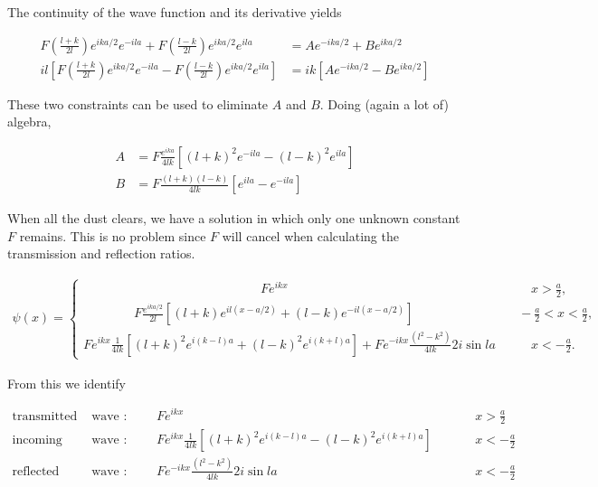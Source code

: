 The continuity of the wave function and its derivative yields 

\begin{align*}
  F \left( \frac{l+k}{2l} \right) e^{ika/2}e^{-ila} + F \left( \frac{l-k}{2l}
  \right) e^{ika /2 }e^{ila} &= Ae^{-ika/2} + Be^{ika/2}  \\
  il\left[ F \left( \frac{l+k}{2l} \right) e^{ika/2}e^{-ila} - F \left(
\frac{l-k}{2l} \right) e^{ika/2}e^{ila} \right] &= ik\left[ Ae^{-ika/2}
  - Be^{ika/2} \right]  
\end{align*}

These two constraints can be used to eliminate $A$ and $B$. Doing (again a lot
of) algebra, 

\begin{align} \label{}
  A &= F\frac{e^{ika}}{4lk} \left[ (l+k)^2 e^{-ila} - (l-k)^2 e^{ila} \right] \\
  B &= F \frac{(l+k)(l-k)}{4lk} \left[ e^{ila} - e^{-ila}\right]
\end{align}\vspace{3px}

When all the dust clears, we have a solution in which only one unknown constant
$F$ remains. This is no problem since  $F$ will cancel when calculating the
transmission and reflection ratios. 

\begin{align}
  \psi(x) = \begin{cases}
    \qquad \qquad \qquad \qquad \qquad \qquad \qquad  Fe^{ikx} &\quad \quad x > \frac{a}{2}, \\ 
    \qquad \qquad   F\frac{e^{ika/2}}{2l} \left[ (l+k)e^{il(x - a/2)} + (l-k)e^{-il(x
    - a/2)}\right] &\quad -\frac{a}{2} < x < \frac{a}{2}, \\ 
    Fe^{ikx}\frac{1}{4lk} \left[(l+k)^2 e^{i(k-l)a} + (l-k)^2e^{i(k+l)a}\right]
    + Fe^{-ikx} \frac{(l^2 - k^2)}{4lk} 2i\sin la &\quad \quad x < -\frac{a}{2}.
\end{cases} 
\end{align} \vspace{3px}


From this we identify

\begin{align}
  \text{transmitted} &\text{ wave : } &&\quad Fe^{ikx} &&& \quad x > \frac{a}{2} \\
  \text{incoming} &\text{ wave : } &&\quad Fe^{ikx} \frac{1}{4lk} \left[ (l
  + k)^2 e^{i(k-l)a} - (l-k)^2 e^{i(k+l)a} \right] &&&\quad x < -\frac{a}{2} \\
  \text{reflected} &\text{ wave : } &&\quad Fe^{-ikx} \frac{(l^2 - k^2)}{4lk}
  2i\sin la &&&\quad x < -\frac{a}{2}
\end{align}

